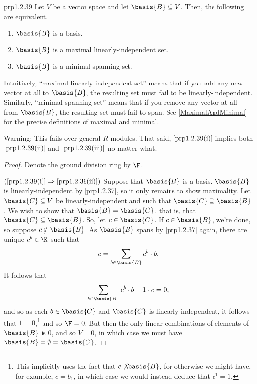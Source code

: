 \begin{prp}{}{prp1.2.39}
	Let $V$ be a vector space and let $\basis{B}\subseteq V$.  Then, the following are equivalent.
	\begin{enumerate}
		\item \label{prp1.2.39(i)}$\basis{B}$ is a basis.
		\item \label{prp1.2.39(ii)}$\basis{B}$ is a maximal linearly-independent set.
		\item \label{prp1.2.39(iii)}$\basis{B}$ is a minimal spanning set.
	\end{enumerate}
	\begin{rmk}
		Intuitively, ``maximal linearly-independent set'' means that if you add any new vector at all to $\basis{B}$, the resulting set must fail to be linearly-independent.  Similarly, ``minimal spanning set'' means that if you remove any vector at all from $\basis{B}$, the resulting set must fail to span.  See \cref{MaximalAndMinimal} for the precise definitions of maximal and minimal.
	\end{rmk}
	\begin{rmk}
		Warning:  This fails over general $R$-modules.  That said, $\cref{prp1.2.39(i)}$ implies both $\cref{prp1.2.39(ii)}$ and $\cref{prp1.2.39(iii)}$ no matter what.
	\end{rmk}
	\begin{proof}
		Denote the ground division ring by $\F$.
		
		\blni
		$(\cref{prp1.2.39(i)}\Rightarrow \cref{prp1.2.39(ii)})$ Suppose that $\basis{B}$ is a basis.  $\basis{B}$ is linearly-independent by \cref{prp1.2.37}, so it only remains to show maximality.  Let $\basis{C}\subseteq V$ be linearly-independent and such that $\basis{C}\supseteq \basis{B}$.  We wish to show that $\basis{B}=\basis{C}$, that is, that $\basis{C}\subseteq \basis{B}$.  So, let $c\in \basis{C}$.  If $c\in \basis{B}$, we're done, so suppose $c\notin \basis{B}$.  As $\basis{B}$ spans by \cref{prp1.2.37} again, there are unique $c^b\in \K$ such that
		\begin{equation}
		c=\sum _{b\in \basis{B}}c^b\cdot b.
		\end{equation}
		It follows that
		\begin{equation}
		\sum _{b\in \basis{B}}c^b\cdot b-1\cdot c=0,
		\end{equation}
		and so as each $b\in \basis{C}$ and $\basis{C}$ is linearly-independent, it follows that $1=0$,\footnote{This implicitly uses the fact that $c\not \basis{B}$, for otherwise we might have, for example, $c=b_1$, in which case we would instead deduce that $c^1=1$.} and so $\F =0$.  But then the only linear-combinations of elements of $\basis{B}$ is $0$, and so $V=0$, in which case we must have $\basis{B}=\emptyset =\basis{C}$.
		

\end{proof}
\end{prp}
